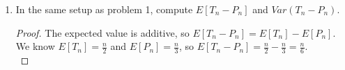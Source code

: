 \documentclass[a4paper]{article}
\begin{document}
\begin{enumerate}
\begin{proof}{Proof by contradiction}
       For example, consider the $P(T_n = n)$ i.e. when all the items chosen after $n$ weeks are tops,  $P(T_n=n) = 
       \text{ no. ways} \cdot \text{ probability} = 1 \cdot \frac{1}{2}^n$. Then $P(T_n = n \cap P_n = b \cap S_n = c) = 0$
       when $b,c > 0$. However, suppose $b,c=1$,  $ P(T_n=n) \cdot P(P_n=1) \cdot P(S_n=1) = \frac{1}{2}^n \cdot 
       \begin{pmatrix} n\\1 \end{pmatrix} \frac{1}{3}\frac{1}{3}^{n-1} \cdot \begin{pmatrix} n \\ 1 \end{pmatrix} \frac{1}{6} \frac{5}{6}^{n-1} 
       \neq 0$! Thus, the three random variables are not independent!
    \end{proof}
  \item In the same setup as problem 1, compute $E[T_n - P_n]$ and  $Var(T_n - P_n)$.
    \begin{proof}
      The expected value is additive, so $E[T_n - P_n] = E[T_n] - E[P_n]$. We know  $E[T_n] = \frac{n}{2}$ and
      $E[P_n] = \frac{n}{3}$, so $E[T_n - P_n] = \frac{n}{2} - \frac{n}{3} = \frac{n}{6}$. \\


\end{proof}
\end{enumerate}
\end{document}
